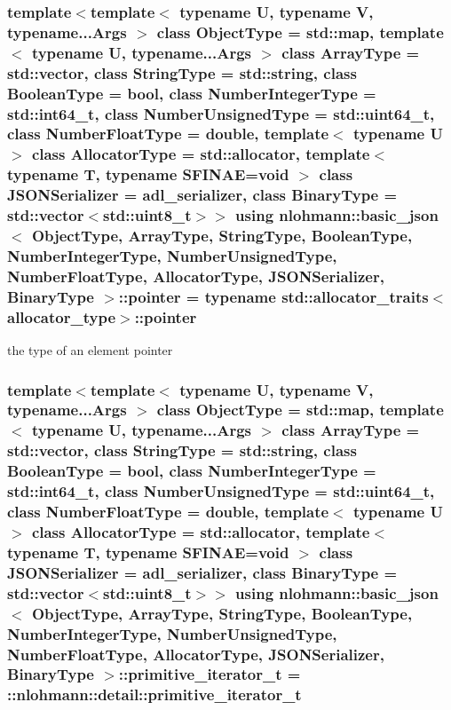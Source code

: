 \subsubsection[{\texorpdfstring{pointer}{pointer}}]{\setlength{\rightskip}{0pt plus 5cm}template$<$template$<$ typename U, typename V, typename...\+Args $>$ class Object\+Type = std\+::map, template$<$ typename U, typename...\+Args $>$ class Array\+Type = std\+::vector, class String\+Type  = std\+::string, class Boolean\+Type  = bool, class Number\+Integer\+Type  = std\+::int64\+\_\+t, class Number\+Unsigned\+Type  = std\+::uint64\+\_\+t, class Number\+Float\+Type  = double, template$<$ typename U $>$ class Allocator\+Type = std\+::allocator, template$<$ typename T, typename S\+F\+I\+N\+A\+E=void $>$ class J\+S\+O\+N\+Serializer = adl\+\_\+serializer, class Binary\+Type  = std\+::vector$<$std\+::uint8\+\_\+t$>$$>$ using {\bf nlohmann\+::basic\+\_\+json}$<$ Object\+Type, Array\+Type, String\+Type, Boolean\+Type, Number\+Integer\+Type, Number\+Unsigned\+Type, Number\+Float\+Type, Allocator\+Type, J\+S\+O\+N\+Serializer, Binary\+Type $>$\+::{\bf pointer} =  typename std\+::allocator\+\_\+traits$<${\bf allocator\+\_\+type}$>$\+::{\bf pointer}}\hypertarget{classnlohmann_1_1basic__json_a42e5c23402f4c2e1df487e1d102bc5fa}{}\label{classnlohmann_1_1basic__json_a42e5c23402f4c2e1df487e1d102bc5fa}


the type of an element pointer 

\subsubsection[{\texorpdfstring{primitive\+\_\+iterator\+\_\+t}{primitive_iterator_t}}]{\setlength{\rightskip}{0pt plus 5cm}template$<$template$<$ typename U, typename V, typename...\+Args $>$ class Object\+Type = std\+::map, template$<$ typename U, typename...\+Args $>$ class Array\+Type = std\+::vector, class String\+Type  = std\+::string, class Boolean\+Type  = bool, class Number\+Integer\+Type  = std\+::int64\+\_\+t, class Number\+Unsigned\+Type  = std\+::uint64\+\_\+t, class Number\+Float\+Type  = double, template$<$ typename U $>$ class Allocator\+Type = std\+::allocator, template$<$ typename T, typename S\+F\+I\+N\+A\+E=void $>$ class J\+S\+O\+N\+Serializer = adl\+\_\+serializer, class Binary\+Type  = std\+::vector$<$std\+::uint8\+\_\+t$>$$>$ using {\bf nlohmann\+::basic\+\_\+json}$<$ Object\+Type, Array\+Type, String\+Type, Boolean\+Type, Number\+Integer\+Type, Number\+Unsigned\+Type, Number\+Float\+Type, Allocator\+Type, J\+S\+O\+N\+Serializer, Binary\+Type $>$\+::{\bf primitive\+\_\+iterator\+\_\+t} =  \+::{\bf nlohmann\+::detail\+::primitive\+\_\+iterator\+\_\+t}\hspace{0.3cm}{\ttfamily [private]}}\hypertarget{classnlohmann_1_1basic__json_ae2cb9166f46abfc6d3910e076410f1ca}{}\label{classnlohmann_1_1basic__json_ae2cb9166f46abfc6d3910e076410f1ca}
